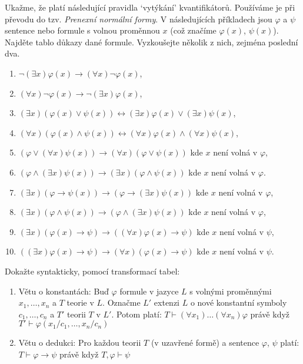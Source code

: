 \documentclass[a4paper,12pt]{article}
\begin{document}
\medskip\begin{problem} %
    Ukažme, že platí následující pravidla `vytýkání' kvantifikátorů. Používáme je při převodu do tzv. \emph{Prenexní normální formy}. V následujících příkladech jsou $\varphi$ a $\psi$ sentence nebo formule s volnou proměnnou $x$ (což značíme $\varphi(x)$, $\psi(x)$). Najděte tablo důkazy dané formule. Vyzkoušejte několik z nich, zejména poslední dva.
\begin{enumerate}[noitemsep]
    \item $\neg(\exists x)\varphi(x)\to (\forall x)\neg \varphi(x)$,
    \item $(\forall x)\neg \varphi(x)\to \neg(\exists x)\varphi(x)$,
    \item $(\exists x)(\varphi(x)\vee \psi(x))\leftrightarrow (\exists x)\varphi(x)\vee (\exists x)\psi(x)$,
    \item $(\forall x)(\varphi(x)\wedge\psi(x))\leftrightarrow (\forall x)\varphi(x)\wedge(\forall x)\psi(x)$,
    \item $(\varphi \vee (\forall x)\psi(x))\to (\forall x)(\varphi \vee \psi(x))$ kde $x$ není volná v $\varphi$,
    \item $(\varphi \wedge (\exists x)\psi(x))\to (\exists x)(\varphi \wedge \psi(x))$ kde $x$ není volná v $\varphi$.
    \item $(\exists x)(\varphi \to \psi(x))\to(\varphi \to (\exists x)\psi(x))$ kde $x$ není volná v $\varphi$,
    \item $(\exists x)(\varphi \wedge \psi(x))\to(\varphi \wedge (\exists x)\psi(x))$ kde $x$ není volná v $\varphi$,
    \item $(\exists x)(\varphi(x)\to\psi)\to((\forall x)\varphi(x)\to \psi)$ kde $x$ není volná v $\psi$,
    \item $((\exists x)\varphi(x)\to\psi)\to(\forall x)(\varphi(x)\to \psi)$ kde $x$ není volná v $\psi$.
\end{enumerate}
\end{problem}


\medskip\begin{problem} Dokažte syntakticky, pomocí transformací tabel:
\begin{enumerate}
    \item Větu o konstantách: Buď $\varphi$ formule v jazyce $L$ s volnými proměnnými $x_1,\dots,x_n$ a $T$ teorie v $L$. Označme $L'$ extenzi $L$ o nové konstantní symboly $c_1,\dots,c_n$ a $T'$ teorii $T$ v $L'$. Potom platí:
    $T \vdash (\forall x_1)\dots(\forall x_n)\varphi$ právě když $T'\vdash\varphi(x_1/c_1,\dots,x_n/c_n)$
    \item Větu o dedukci: Pro každou teorii $T$ (v uzavřené formě) a sentence $\varphi$, $\psi$ platí: $T\vdash \varphi\to\psi$ právě když $T,\varphi\vdash\psi$
\end{enumerate}
\end{problem} 
  
\end{document}
